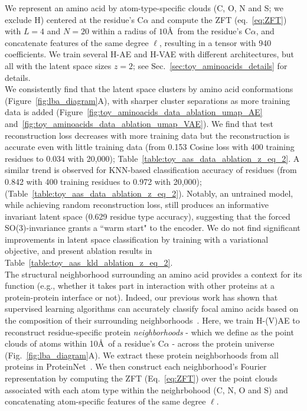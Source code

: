 We represent an amino acid by atom-type-specific clouds (C, O, N and S; we exclude H) centered at
the residue's C$\alpha$ and compute the ZFT (eq.~\ref{eq:ZFT}) with $L = 4$ and $N = 20$ within a
radius of $10$\AA\, from the residue's C$\alpha$, and concatenate features of the same degree
$\ell$, resulting in a tensor with 940 coefficients. We train several H-AE and H-VAE with different
architectures, but all with the latent space sizes $z=2$; see Sec.~\ref{sec:toy_aminoacids_details}
for details.\\ 


We consistently find that the latent space clusters by amino acid conformations
(Figure~\ref{fig:lba_diagram}A), with sharper cluster separations as more training data is added
(Figure~\ref{fig:toy_aminoacids_data_ablation_umap_AE}
and~\ref{fig:toy_aminoacids_data_ablation_umap_VAE}). We find that test reconstruction loss
decreases with more training data but the reconstruction is accurate even with little training data
(from 0.153 Cosine loss with 400 training residues to 0.034 with 20,000); 
Table~\ref{table:toy_aas_data_ablation_z_eq_2}. A similar trend is observed for KNN-based
classification accuracy of residues (from 0.842 with 400 training residues to 0.972 with 20,000);
(Table~\ref{table:toy_aas_data_ablation_z_eq_2}). Notably, an untrained model, while achieving
random reconstruction loss, still produces an informative invariant latent space (0.629 residue
type accuracy), suggesting that the forced SO(3)-invariance grants a ``warm start" to the encoder.
We do not find significant improvements in latent space classification by training with a
variational objective, and present ablation results in
Table~\ref{table:toy_aas_kld_ablation_z_eq_2}.\\



  The structural
neighborhood surrounding an amino acid provides a context for its function (e.g., whether it takes
part in interaction with other proteins at a protein-protein interface or not). Indeed, our
previous work has shown that supervised learning algorithms can accurately classify focal amino
acids based on the composition of their surrounding neighborhoods~\cite{pun_learning_2022}. Here,
we  train H-(V)AE to reconstruct residue-specific protein \textit{neighborhoods} - which we define
as the point clouds of atoms within 10\AA\, of a residue's C$\alpha$ - across the protein universe
(Fig.~\ref{fig:lba_diagram}A).  We extract these protein neighborhoods from all proteins in
ProteinNet~\cite{alquraishi_proteinnet_2019}. We then construct each neighborhood's Fourier
representation by computing the ZFT (Eq.~\ref{eq:ZFT}) over the point clouds associated with each
atom type within the neighrbohood (C, N, O and S) and concatenating atom-specific features of the
same degree $\ell$.

